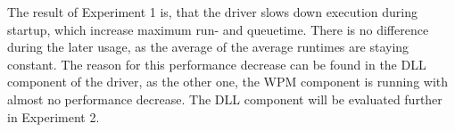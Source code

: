 \medskip

The result of Experiment 1 is, that the driver slows down execution during startup, which increase maximum run- and queuetime. There is no difference during the later usage, as the average of the average runtimes are staying constant. The reason for this performance decrease can be found in the \gls{DLL} component of the driver, as the other one, the \gls{WPM} component is running with almost no performance decrease. The \gls{DLL} component will be evaluated further in Experiment 2.